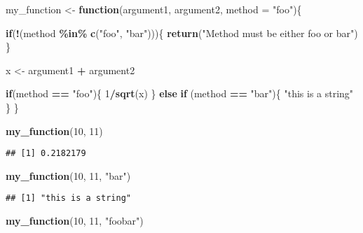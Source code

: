 \documentclass[
]{article}
\newenvironment{Shaded}{\begin{snugshade}}{\end{snugshade}}
\newcommand{\ControlFlowTok}[1]{\textcolor[rgb]{0.13,0.29,0.53}{\textbf{#1}}}
\newcommand{\DataTypeTok}[1]{\textcolor[rgb]{0.13,0.29,0.53}{#1}}
\newcommand{\DecValTok}[1]{\textcolor[rgb]{0.00,0.00,0.81}{#1}}
\newcommand{\KeywordTok}[1]{\textcolor[rgb]{0.13,0.29,0.53}{\textbf{#1}}}
\newcommand{\NormalTok}[1]{#1}
\newcommand{\OperatorTok}[1]{\textcolor[rgb]{0.81,0.36,0.00}{\textbf{#1}}}
\newcommand{\StringTok}[1]{\textcolor[rgb]{0.31,0.60,0.02}{#1}}
\begin{document}
\begin{Shaded}
\begin{Highlighting}[]
\NormalTok{my\_function \textless{}{-}}\StringTok{ }\ControlFlowTok{function}\NormalTok{(argument1, argument2, }\DataTypeTok{method =} \StringTok{"foo"}\NormalTok{)\{}
  
  \ControlFlowTok{if}\NormalTok{(}\OperatorTok{!}\NormalTok{(method }\OperatorTok{\%in\%}\StringTok{ }\KeywordTok{c}\NormalTok{(}\StringTok{"foo"}\NormalTok{, }\StringTok{"bar"}\NormalTok{)))\{}
    \KeywordTok{return}\NormalTok{(}\StringTok{"Method must be either \textquotesingle{}foo\textquotesingle{} or \textquotesingle{}bar\textquotesingle{}"}\NormalTok{)}
\NormalTok{  \}}
  
\NormalTok{  x \textless{}{-}}\StringTok{ }\NormalTok{argument1 }\OperatorTok{+}\StringTok{ }\NormalTok{argument2}
  
  \ControlFlowTok{if}\NormalTok{(method }\OperatorTok{==}\StringTok{ "foo"}\NormalTok{)\{}
    \DecValTok{1}\OperatorTok{/}\KeywordTok{sqrt}\NormalTok{(x)}
\NormalTok{  \} }\ControlFlowTok{else} \ControlFlowTok{if}\NormalTok{ (method }\OperatorTok{==}\StringTok{ "bar"}\NormalTok{)\{}
    \StringTok{"this is a string"}
\NormalTok{    \}}
\NormalTok{\}}

\KeywordTok{my\_function}\NormalTok{(}\DecValTok{10}\NormalTok{, }\DecValTok{11}\NormalTok{)}
\end{Highlighting}
\end{Shaded}

\begin{verbatim}
## [1] 0.2182179
\end{verbatim}

\begin{Shaded}
\begin{Highlighting}[]
\KeywordTok{my\_function}\NormalTok{(}\DecValTok{10}\NormalTok{, }\DecValTok{11}\NormalTok{, }\StringTok{"bar"}\NormalTok{)}
\end{Highlighting}
\end{Shaded}

\begin{verbatim}
## [1] "this is a string"
\end{verbatim}

\begin{Shaded}
\begin{Highlighting}[]
\KeywordTok{my\_function}\NormalTok{(}\DecValTok{10}\NormalTok{, }\DecValTok{11}\NormalTok{, }\StringTok{"foobar"}\NormalTok{)}
\end{Highlighting}
\end{Shaded}
\end{document}
